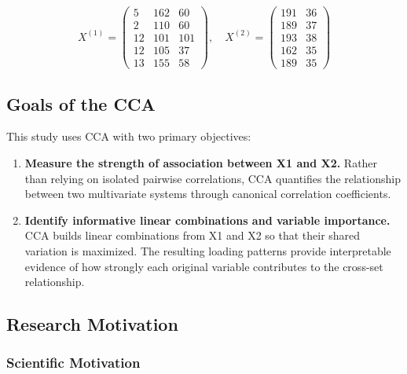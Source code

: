 \begin{equation*}
    X^{(1)} = \begin{pmatrix}
    5 & 162 & 60 \\
    2 & 110 & 60 \\
    12 & 101 & 101 \\
    12 & 105 & 37 \\
    13 & 155 & 58
    \end{pmatrix}, \quad
    X^{(2)} = \begin{pmatrix}
    191 & 36 \\
    189 & 37 \\
    193 & 38 \\
    162 & 35 \\
    189 & 35
    \end{pmatrix}
\end{equation*}

\subsection{Goals of the CCA}
This study uses CCA with two primary objectives:
\begin{enumerate}[leftmargin=1.8em, label=\textbf{(\arabic*)}]
  \item \textbf{Measure the strength of association between X1 and X2.}
  Rather than relying on isolated pairwise correlations, CCA quantifies the relationship between two multivariate systems through canonical correlation coefficients.

  \item \textbf{Identify informative linear combinations and variable importance.}
  CCA builds linear combinations from X1 and X2 so that their shared variation is maximized. The resulting loading patterns provide interpretable evidence of how strongly each original variable contributes to the cross-set relationship.
\end{enumerate}

\subsection{Research Motivation}

\subsubsection{Scientific Motivation}

